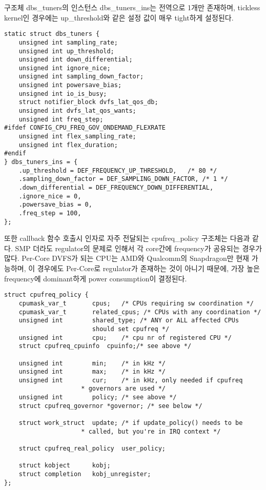 \vspace{\baselineskip}

구조체 dbs\_tuners의 인스턴스 dbs\_tuners\_ins는 전역으로 1개만 존재하며, tickless kernel인 경우에는 up\_threshold와 같은 설정 값이 매우 tight하게 설정된다. 
\begin{lstlisting}
static struct dbs_tuners {
    unsigned int sampling_rate;
    unsigned int up_threshold;
    unsigned int down_differential;
    unsigned int ignore_nice;
    unsigned int sampling_down_factor;
    unsigned int powersave_bias;
    unsigned int io_is_busy;
    struct notifier_block dvfs_lat_qos_db;
    unsigned int dvfs_lat_qos_wants;
    unsigned int freq_step;
#ifdef CONFIG_CPU_FREQ_GOV_ONDEMAND_FLEXRATE
    unsigned int flex_sampling_rate;
    unsigned int flex_duration;
#endif
} dbs_tuners_ins = {
    .up_threshold = DEF_FREQUENCY_UP_THRESHOLD,   /* 80 */
    .sampling_down_factor = DEF_SAMPLING_DOWN_FACTOR, /* 1 */
    .down_differential = DEF_FREQUENCY_DOWN_DIFFERENTIAL,
    .ignore_nice = 0, 
    .powersave_bias = 0, 
    .freq_step = 100, 
};
\end{lstlisting}

\vspace{\baselineskip}

또한 callback 함수 호출시 인자로 자주 전달되는 cpufreq\_policy 구조체는 다음과 같다.
SMP 더라도 regulator의 문제로 인해서 각 core간에 frequency가 공유되는 경우가 많다.
Per-Core DVFS가 되는 CPU는 AMD와 Qualcomm의 Snapdragon만 현재 가능하며, 이 경우에도  Per-Core로 regulator가 존재하는 것이 아니기 때문에, 가장 높은 frequency에 dominant하게 power consumption이 결정된다. 
\begin{lstlisting}
struct cpufreq_policy { 
    cpumask_var_t       cpus;   /* CPUs requiring sw coordination */
    cpumask_var_t       related_cpus; /* CPUs with any coordination */
    unsigned int        shared_type; /* ANY or ALL affected CPUs
                        should set cpufreq */
    unsigned int        cpu;    /* cpu nr of registered CPU */
    struct cpufreq_cpuinfo  cpuinfo;/* see above */

    unsigned int        min;    /* in kHz */
    unsigned int        max;    /* in kHz */
    unsigned int        cur;    /* in kHz, only needed if cpufreq
                     * governors are used */
    unsigned int        policy; /* see above */
    struct cpufreq_governor *governor; /* see below */

    struct work_struct  update; /* if update_policy() needs to be
                     * called, but you're in IRQ context */

    struct cpufreq_real_policy  user_policy;

    struct kobject      kobj;
    struct completion   kobj_unregister;
};
\end{lstlisting}

